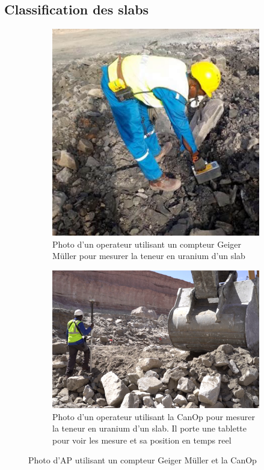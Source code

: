 \subsection{Classification des slabs}
\label{ssec_classification}
\begin{figure}
    
    \begin{subfigure}[t]{0.4\textwidth}
        \centering
        \includegraphics[height=0.3\paperwidth]{img/photo/Travail_geiger.png}
        \caption{Photo d'un operateur utilisant un compteur Geiger Müller pour mesurer la teneur en uranium d'un slab}
        \label{fig_AP_geiger}
    \end{subfigure}
    \begin{subfigure}[t]{0.6\textwidth}
        \centering
        \includegraphics[height=0.3\paperwidth]{img/photo/CanOp_utilisation.png}
        \caption{Photo d'un operateur utilisant la CanOp pour mesurer la teneur en uranium d'un slab. Il porte une tablette pour voir les mesure et sa position en temps reel}
        \label{fig_AP_CanOp}
    \end{subfigure}
    \caption{Photo d'AP utilisant un compteur Geiger Müller et la CanOp}
\end{figure}
